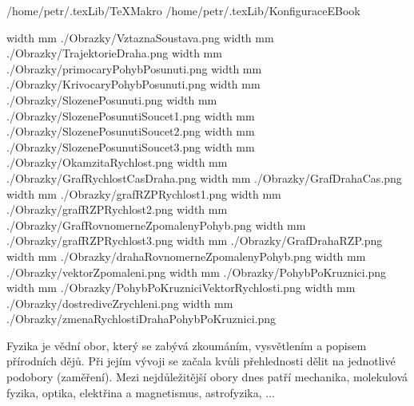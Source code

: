 
\def\addr{/home/petr/.texLib}

 \addr/TeXMakro
\setAddress{\addr}
 \addr/KonfiguraceEBook



\pdfximage width \the\SirkaOdstavce mm {./Obrazky/VztaznaSoustava.png}
\pdfximage width \the\SirkaOdstavce mm {./Obrazky/TrajektorieDraha.png}
\pdfximage width \the\SirkaOdstavce mm {./Obrazky/primocaryPohybPosunuti.png}
\pdfximage width \the\SirkaOdstavce mm {./Obrazky/KrivocaryPohybPosunuti.png}
\pdfximage width \the\SirkaOdstavce mm {./Obrazky/SlozenePosunuti.png}
\pdfximage width \the\SirkaOdstavce mm {./Obrazky/SlozenePosunutiSoucet1.png}
\pdfximage width \the\SirkaOdstavce mm {./Obrazky/SlozenePosunutiSoucet2.png}
\pdfximage width \the\SirkaOdstavce mm {./Obrazky/SlozenePosunutiSoucet3.png}
\pdfximage width \the\SirkaOdstavce mm {./Obrazky/OkamzitaRychlost.png}
\pdfximage width \the\SirkaOdstavce mm {./Obrazky/GrafRychlostCasDraha.png}
\pdfximage width \the\SirkaOdstavce mm {./Obrazky/GrafDrahaCas.png}
\pdfximage width \the\SirkaOdstavce mm {./Obrazky/grafRZPRychlost1.png}
\pdfximage width \the\SirkaOdstavce mm {./Obrazky/grafRZPRychlost2.png}
\pdfximage width \the\SirkaOdstavce mm {./Obrazky/GrafRovnomerneZpomalenyPohyb.png}
\pdfximage width \the\SirkaOdstavce mm {./Obrazky/grafRZPRychlost3.png}
\pdfximage width \the\SirkaOdstavce mm {./Obrazky/GrafDrahaRZP.png}
\pdfximage width \the\SirkaOdstavce mm {./Obrazky/drahaRovnomerneZpomalenyPohyb.png}
\pdfximage width \the\SirkaOdstavce mm {./Obrazky/vektorZpomaleni.png}
\pdfximage width \the\SirkaOdstavce mm {./Obrazky/PohybPoKruznici.png}
\pdfximage width \the\SirkaOdstavce mm {./Obrazky/PohybPoKruzniciVektorRychlosti.png}
\pdfximage width \the\SirkaOdstavce mm {./Obrazky/dostrediveZrychleni.png}
\pdfximage width \the\SirkaOdstavce mm {./Obrazky/zmenaRychlostiDrahaPohybPoKruznici.png}



\Obsah


Fyzika je vědní obor, který se zabývá zkoumáním, vysvětlením a popisem přírodních dějů. Při jejím vývoji se začala kvůli přehlednosti dělit na jednotlivé podobory (zaměření). Mezi nejdůležitější obory dnes patří mechanika, molekulová fyzika, optika, elektřina a magnetismus, astrofyzika, ...

